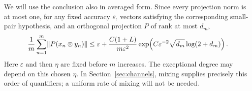 We will use the conclusion also in averaged form.  Since every
projection norm is at most one, for any fixed accuracy $\varepsilon$,
vectors satisfying the corresponding small-pair hypothesis, and an
orthogonal projection $P$ of rank at most $d_m$,
\begin{equation}\label{eq:packing-average}
 \frac1m\sum_{n=1}^m\lVert P(x_n\otimes y_n)\rVert
   \le\varepsilon+
       \frac{C(1+L)}{m\varepsilon^2}
       \exp\!\left(C\varepsilon^{-2}\sqrt{d_m}\log(2+d_m)\right).
\end{equation}
Here $\varepsilon$ and then $\eta$ are fixed before $m$ increases.
The exceptional degree may depend on this chosen $\eta$.  In
Section~\ref{sec:channels}, mixing supplies precisely this order of
quantifiers; a uniform rate of mixing will not be needed.

